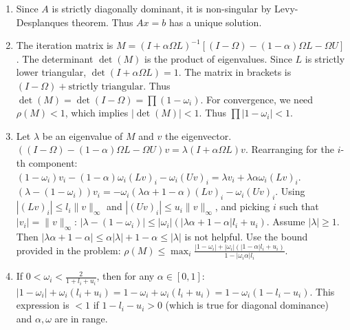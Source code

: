 \begin{solution}
\begin{enumerate}
    \item Since $A$ is strictly diagonally dominant, it is non-singular by Levy-Desplanques theorem. Thus $Ax=b$ has a unique solution.
    \item The iteration matrix is $M = (I + \alpha \Omega L)^{-1} [ (I - \Omega) - (1 - \alpha) \Omega L - \Omega U ]$.
    The determinant $\det(M)$ is the product of eigenvalues.
    Since $L$ is strictly lower triangular, $\det(I + \alpha \Omega L) = 1$.
    The matrix in brackets is $(I - \Omega) + \text{strictly triangular}$.
    Thus $\det(M) = \det(I - \Omega) = \prod (1 - \omega_i)$.
    For convergence, we need $\rho(M) < 1$, which implies $|\det(M)| < 1$.
    Thus $\prod |1 - \omega_i| < 1$.
    \item Let $\lambda$ be an eigenvalue of $M$ and $v$ the eigenvector.
    $((I - \Omega) - (1 - \alpha) \Omega L - \Omega U) v = \lambda (I + \alpha \Omega L) v$.
    Rearranging for the $i$-th component:
    $(1 - \omega_i) v_i - (1 - \alpha) \omega_i (L v)_i - \omega_i (U v)_i = \lambda v_i + \lambda \alpha \omega_i (L v)_i$.
    $(\lambda - (1 - \omega_i)) v_i = - \omega_i (\lambda \alpha + 1 - \alpha) (L v)_i - \omega_i (U v)_i$.
    Using $|(L v)_i| \leq l_i \|v\|_\infty$ and $|(U v)_i| \leq u_i \|v\|_\infty$, and picking $i$ such that $|v_i| = \|v\|_\infty$:
    $|\lambda - (1 - \omega_i)| \leq |\omega_i| (|\lambda \alpha + 1 - \alpha| l_i + u_i)$.
    Assume $|\lambda| \ge 1$. Then $|\lambda \alpha + 1 - \alpha| \le \alpha |\lambda| + 1 - \alpha \le |\lambda|$ is not helpful.
    Use the bound provided in the problem: $\rho(M) \leq \max_i \frac{|1-\omega_i| + |\omega_i|(|1-\alpha|l_i + u_i)}{1 - |\omega_i \alpha| l_i}$.
    \item If $0 < \omega_i < \frac{2}{1 + l_i + u_i}$, then for any $\alpha \in [0,1]$:
    $|1-\omega_i| + \omega_i(l_i + u_i) = 1 - \omega_i + \omega_i(l_i + u_i) = 1 - \omega_i(1 - l_i - u_i)$.
    This expression is $< 1$ if $1 - l_i - u_i > 0$ (which is true for diagonal dominance) and $\alpha, \omega$ are in range.
\end{enumerate}
\end{solution}

